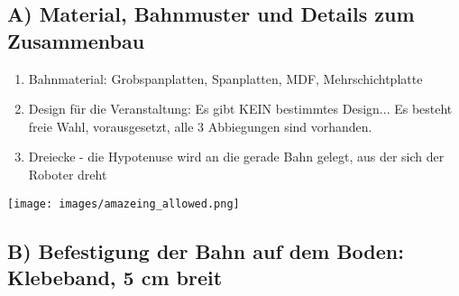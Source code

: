 \documentclass[a4paper,12pt]{article}
\begin{document}
\subsection{A) Material, Bahnmuster und Details zum Zusammenbau}
\begin{enumerate}
	\item Bahnmaterial: Grobspanplatten, Spanplatten, MDF,
		Mehrschichtplatte
	\item Design für die Veranstaltung: Es gibt KEIN bestimmtes Design...
		Es besteht freie Wahl, vorausgesetzt, alle 3 Abbiegungen sind
		vorhanden.
	\item Dreiecke - die Hypotenuse wird an die gerade Bahn gelegt, aus der
		sich der Roboter dreht
\end{enumerate}

\texttt{[image: images/amazeing\_allowed.png]}

\subsection{B) Befestigung der Bahn auf dem Boden: Klebeband, 5 cm breit}
\end{document}
